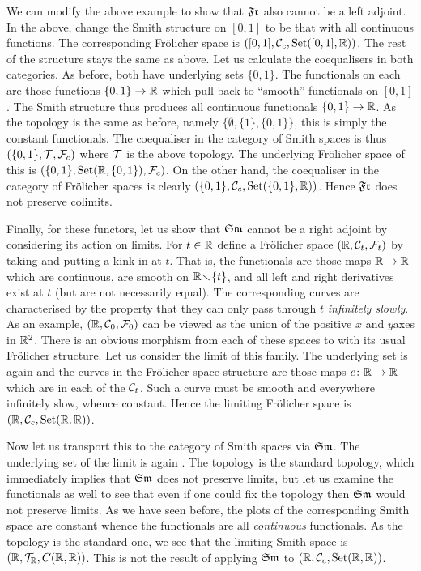 \documentclass[%
12pt,%
arxiv,%
defaults
]{myclass}
\begin{document}
We can modify the above example to show that \(\SmFr\) also cannot be a left adjoint.
In the above, change the Smith structure on \([0,1]\) to be that with all continuous functions.
The corresponding Fr\"olicher space is \(([0,1], \mathcal{C}_c, \operatorname{Set}([0,1], \mathbb{R}))\).
The rest of the structure stays the same as above.
Let us calculate the coequalisers in both categories.
As before, both have underlying sets \(\{0,1\}\).
The functionals on each are those functions \(\{0,1\} \to \mathbb{R}\) which pull back to ``smooth'' functionals on \([0,1]\).
The Smith structure thus produces all continuous functionals \(\{0,1\} \to \mathbb{R}\).
As the topology is the same as before, namely \(\{\emptyset, \{1\}, \{0,1\}\}\), this is simply the constant functionals.
The coequaliser in the category of Smith spaces is thus \((\{0,1\}, \mathcal{T}, \mathcal{F}_c)\) where \(\mathcal{T}\) is the above topology.
The underlying Fr\"olicher space of this is \((\{0,1\}, \operatorname{Set}(\mathbb{R}, \{0,1\}), \mathcal{F}_c)\).
On the other hand, the coequaliser in the category of Fr\"olicher spaces is clearly \((\{0,1\}, \mathcal{C}_c, \operatorname{Set}(\{0,1\}, \mathbb{R}))\).
Hence \(\SmFr\) does not preserve colimits.

\medskip

Finally, for these functors, let us show that \(\FrSm\) cannot be a right adjoint by considering its action on limits.
For \(t \in \mathbb{R}\) define a Fr\"olicher space \((\mathbb{R}, \mathcal{C}_t, \mathcal{F}_t)\) by taking \R and putting a kink in at \(t\).
That is, the functionals are those maps \(\mathbb{R} \to \mathbb{R}\) which are continuous, are smooth on \(\mathbb{R} \!\smallsetminus\! \{t\}\), and all left and right derivatives exist at \(t\) (but are not necessarily equal).
The corresponding curves are characterised by the property that they can only pass through \(t\) \emph{infinitely slowly}.
As an example, \((\mathbb{R}, \mathcal{C}_0, \mathcal{F}_0)\) can be viewed as the union of the positive \(x\)\enhyp{} and \(y\)\enhyp{}axes in \(\mathbb{R}^2\).
There is an obvious morphism from each of these spaces to \R with its usual Fr\"olicher structure.
Let us consider the limit of this family.
The underlying set is again \R and the curves in the Fr\"olicher space structure are those maps \(c \colon \mathbb{R} \to \mathbb{R}\) which are in each of the \(\mathcal{C}_t\).
Such a curve must be smooth and everywhere infinitely slow, whence constant.
Hence the limiting Fr\"olicher space is \((\mathbb{R}, \mathcal{C}_c, \operatorname{Set}(\mathbb{R},\mathbb{R}))\).

Now let us transport this to the category of Smith spaces via \(\FrSm\).
The underlying set of the limit is again \R.
The topology is the standard topology, which immediately implies that \(\FrSm\) does not preserve limits, but let us examine the functionals as well to see that even if one could fix the topology then \(\FrSm\) would not preserve limits.
As we have seen before, the plots of the corresponding Smith space are constant whence the functionals are all \emph{continuous} functionals.
As the topology is the standard one, we see that the limiting Smith space is \((\mathbb{R}, \mathcal{T}_\mathbb{R}, C(\mathbb{R},\mathbb{R}))\).
This is not the result of applying \(\FrSm\) to \((\mathbb{R}, \mathcal{C}_c, \operatorname{Set}(\mathbb{R},\mathbb{R}))\).
\end{document}
